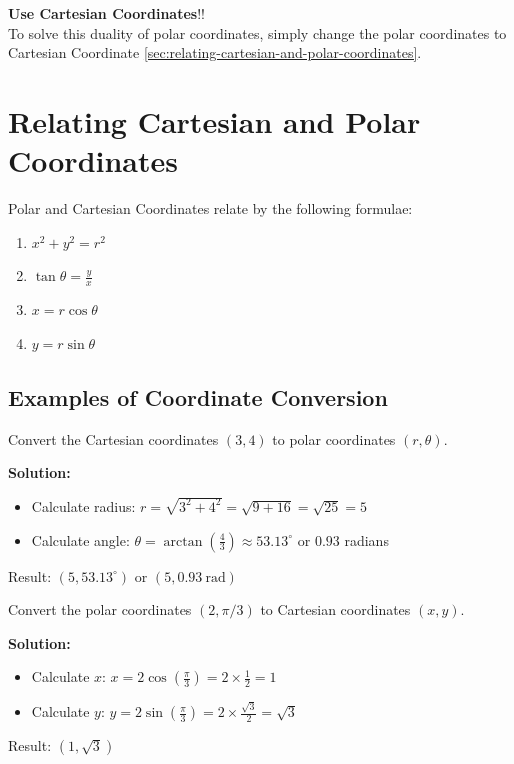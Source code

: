 \begin{note}
  \textbf{Use Cartesian Coordinates}!!\\
  To solve this duality of polar coordinates, simply change the polar
  coordinates to Cartesian Coordinate
  \autoref{sec:relating-cartesian-and-polar-coordinates}.
\end{note}


\section{Relating Cartesian and Polar Coordinates}
\label{sec:relating-cartesian-and-polar-coordinates}
Polar and Cartesian Coordinates relate by the following formulae:
\begin{enumerate}
  \item \(x^2+y^2 = r^2\) 
  \item \(\tan \theta = \frac{y}{x}\) 
  \item \(x = r\cos\theta\) 
  \item \(y = r\sin\theta\)
\end{enumerate}
\subsection*{Examples of Coordinate Conversion}
\label{ssec:examples-of-coordinate-conversion}

\begin{eg}
  Convert the Cartesian coordinates $(3, 4)$ to polar coordinates $(r, \theta)$.

  \textbf{Solution:}
  \begin{itemize}
    \item Calculate radius: $r = \sqrt{3^2 + 4^2} = \sqrt{9 + 16} = \sqrt{25} = 5$
    \item Calculate angle: $\theta = \arctan\left(\frac{4}{3}\right) \approx 53.13^\circ$ or $0.93$ radians
  \end{itemize}
  Result: $(5, 53.13^\circ)$ or $(5, 0.93\ \text{rad})$
\end{eg}

\begin{eg}
  Convert the polar coordinates $(2, \pi/3)$ to Cartesian coordinates $(x, y)$.

  \textbf{Solution:}
  \begin{itemize}
    \item Calculate $x$: $x = 2\cos\left(\frac{\pi}{3}\right) = 2 \times \frac{1}{2} = 1$
    \item Calculate $y$: $y = 2\sin\left(\frac{\pi}{3}\right) = 2 \times \frac{\sqrt{3}}{2} = \sqrt{3}$
  \end{itemize}
  Result: $(1, \sqrt{3})$
\end{eg}


